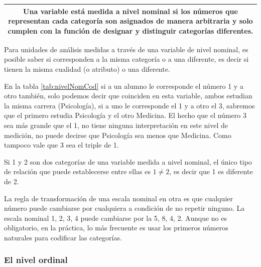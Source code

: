 \documentclass[]{book}
\begin{document}
\begin{longtable}[]{@{}c@{}}
\toprule
\endhead
\begin{minipage}[t]{0.97\columnwidth}\centering
Una variable está medida a nivel \textbf{nominal} si los números que representan cada categoría son asignados de manera arbitraria y solo cumplen con la función de designar y distinguir categorías diferentes.\strut
\end{minipage}\tabularnewline
\bottomrule
\end{longtable}

Para unidades de análisis medidas a través de una variable de nivel nominal, es posible saber si corresponden a la misma categoría o a una diferente, es decir si tienen la misma cualidad (o atributo) o una diferente.

En la tabla \ref{tab:nivelNomCod} si a un alumno le corresponde el número 1 y a otro también, solo podemos decir que coinciden en esta variable, ambos estudian la misma carrera (Psicología), si a uno le corresponde el 1 y a otro el 3, sabremos que el primero estudia Psicología y el otro Medicina. El hecho que el número 3 sea más grande que el 1, no tiene ninguna interpretación en este nivel de medición, no puede decirse que Psicología sea menos que Medicina. Como tampoco vale que 3 sea el triple de 1.

Si 1 y 2 son dos categorías de una variable medida a nivel nominal, el único tipo de relación que puede establecerse entre ellas es \(1\neq2\), es decir que 1 es diferente de 2.

La regla de transformación de una escala nominal en otra es que cualquier número puede cambiarse por cualquiera a condición de no repetir ninguno. La escala nominal 1, 2, 3, 4 puede cambiarse por la 5, 8, 4, 2. Aunque no es obligatorio, en la práctica, lo más frecuente es usar los primeros números naturales para codificar las categorías.

\hypertarget{el-nivel-ordinal}{%
\subsubsection{El nivel ordinal}\label{el-nivel-ordinal}}
\end{document}

